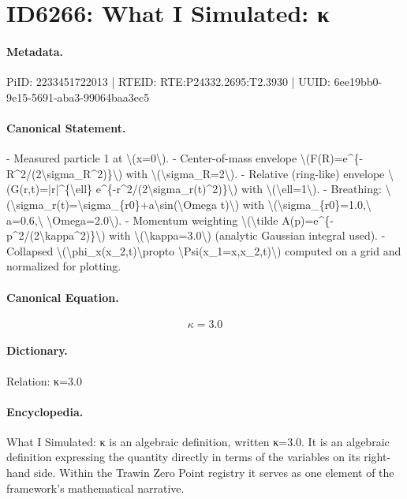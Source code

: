\section*{ID6266: What I Simulated: κ}
\paragraph{Metadata.}
PiID: 2233451722013 | RTEID: RTE:P24332.2695:T2.3930 | UUID: 6ee19bb0-9e15-5691-aba3-99064baa3ec5

\paragraph{Canonical Statement.}
- Measured particle 1 at \textbackslash{}(x=0\textbackslash{}). - Center-of-mass envelope \textbackslash{}(F(R)=e\textasciicircum{}\{-R\textasciicircum{}2/(2\textbackslash{}sigma\_R\textasciicircum{}2)\}\textbackslash{}) with \textbackslash{}(\textbackslash{}sigma\_R=2\textbackslash{}). - Relative (ring-like) envelope \textbackslash{}(G(r,t)=|r|\textasciicircum{}\{\textbackslash{}ell\} e\textasciicircum{}\{-r\textasciicircum{}2/(2\textbackslash{}sigma\_r(t)\textasciicircum{}2)\}\textbackslash{}) with \textbackslash{}(\textbackslash{}ell=1\textbackslash{}). - Breathing: \textbackslash{}(\textbackslash{}sigma\_r(t)=\textbackslash{}sigma\_\{r0\}+a\textbackslash{}sin(\textbackslash{}Omega t)\textbackslash{}) with \textbackslash{}(\textbackslash{}sigma\_\{r0\}=1.0,\textbackslash{} a=0.6,\textbackslash{} \textbackslash{}Omega=2.0\textbackslash{}). - Momentum weighting \textbackslash{}(\textbackslash{}tilde A(p)=e\textasciicircum{}\{-p\textasciicircum{}2/(2\textbackslash{}kappa\textasciicircum{}2)\}\textbackslash{}) with \textbackslash{}(\textbackslash{}kappa=3.0\textbackslash{}) (analytic Gaussian integral used). - Collapsed \textbackslash{}(\textbackslash{}phi\_x(x\_2,t)\textbackslash{}propto \textbackslash{}Psi(x\_1=x,x\_2,t)\textbackslash{}) computed on a grid and normalized for plotting.

\paragraph{Canonical Equation.}
\[
\kappa=3.0
\]

\paragraph{Dictionary.}
Relation: κ=3.0

\paragraph{Encyclopedia.}
What I Simulated: κ is an algebraic definition, written κ=3.0. It is an algebraic definition expressing the quantity directly in terms of the variables on its right-hand side. Within the Trawin Zero Point registry it serves as one element of the framework's mathematical narrative.
